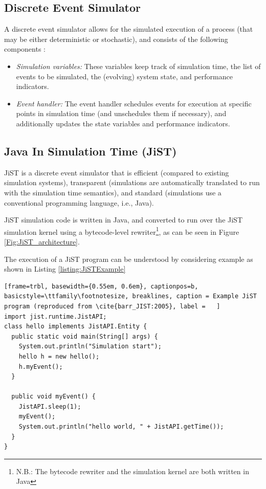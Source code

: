 \subsection{Discrete Event Simulator}

A discrete event simulator allows for the simulated execution of a process (that
may be either deterministic or stochastic), and consists of the following
components \cite{Shankar_DiscreteEventSim}:

\begin{itemize}
  \item \emph{Simulation variables:} These variables keep track of simulation 
  time, the list of events to be simulated, the (evolving) system state, and 
  performance indicators.
  \item \emph{Event handler:} The event handler schedules events for execution 
  at specific points in simulation time (and unschedules them if necessary), 
  and additionally updates the state variables and performance indicators.
\end{itemize}
 
\subsection{Java In Simulation Time (JiST)} \label{subsec:jist}

JiST \cite{barr_JIST:2005} is a discrete event simulator that is 
efficient (compared to existing simulation systems), 
transparent (simulations are automatically translated to run with the 
simulation time semantics), and standard (simulations use a
conventional programming language, i.e., Java).

JiST simulation code is written in Java, and converted to run over the JiST 
simulation kernel using a bytecode-level rewriter\footnote{N.B.: The bytecode 
rewriter and the simulation kernel are both written in Java},  as can be seen 
in Figure \ref{Fig:JiST_architecture}.

The execution of a JiST program can be understood by considering example as
shown in Listing \ref{listing:JiSTExample}

\begin{lstlisting}[frame=trbl, basewidth={0.55em, 0.6em}, captionpos=b, 
basicstyle=\ttfamily\footnotesize, breaklines, caption = Example JiST program (reproduced from \cite{barr_JIST:2005}, label =   ]  
import jist.runtime.JistAPI;  
class hello implements JistAPI.Entity { 
  public static void main(String[] args) { 
    System.out.println("Simulation start"); 
    hello h = new hello(); 
    h.myEvent(); 
  } 
 
  public void myEvent() { 
    JistAPI.sleep(1); 
    myEvent(); 
    System.out.println("hello world, " + JistAPI.getTime()); 
  } 
} 
\end{lstlisting}

